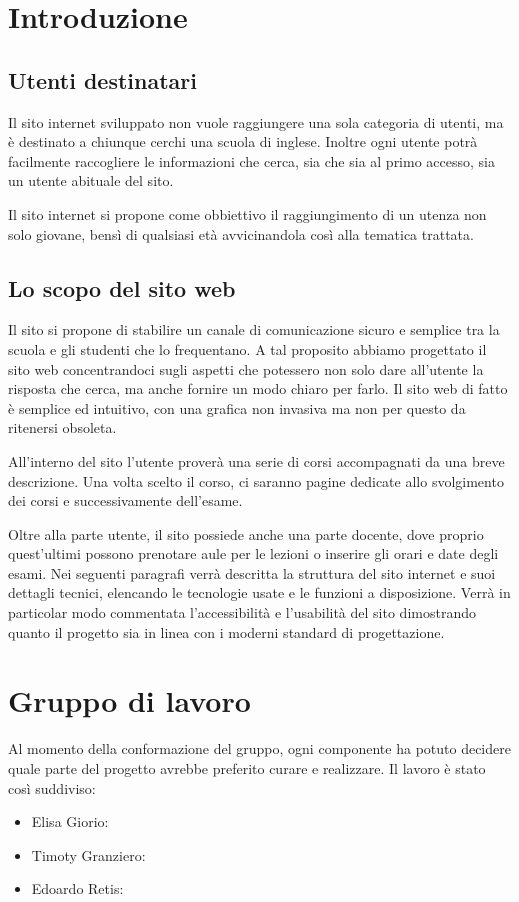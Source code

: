 \documentclass[12pt, a4paper]{article}
\begin{document}
\section{Introduzione}

\subsection{Utenti destinatari}
Il sito internet sviluppato non vuole raggiungere una sola categoria di utenti, ma è destinato a chiunque cerchi una scuola di inglese.  Inoltre ogni utente potrà facilmente raccogliere le informazioni che cerca, sia che sia al primo accesso, sia un utente abituale del sito.\par
Il sito internet si propone come obbiettivo il raggiungimento di un utenza non solo giovane, bensì di qualsiasi età avvicinandola così alla tematica trattata.

\subsection{Lo scopo del sito web}
Il sito si propone di stabilire un canale di comunicazione sicuro e semplice tra la scuola e gli studenti che lo frequentano. A tal proposito abbiamo progettato il sito web concentrandoci sugli aspetti che potessero non solo dare all’utente la risposta che cerca, ma anche fornire un modo chiaro per farlo. Il sito web di fatto è semplice ed intuitivo, con una grafica non invasiva ma non per questo da ritenersi obsoleta.\par
\smallskip
All’interno del sito l’utente proverà una serie di corsi accompagnati da una breve descrizione. Una volta scelto il corso, ci saranno pagine dedicate allo svolgimento dei corsi e successivamente dell’esame.\par
\smallskip
Oltre alla parte utente, il sito possiede anche una parte docente, dove proprio quest’ultimi possono prenotare aule per le lezioni o inserire gli orari e date degli esami.
Nei seguenti paragrafi verrà descritta la struttura del sito internet e suoi dettagli tecnici, elencando le tecnologie usate e le funzioni a disposizione. Verrà in particolar modo commentata l’accessibilità e l’usabilità del sito dimostrando quanto il progetto sia in linea con i moderni standard di progettazione.

\section{Gruppo di lavoro}
Al momento della conformazione del gruppo, ogni componente ha potuto decidere quale parte del progetto avrebbe preferito curare e realizzare. 
Il lavoro è stato così suddiviso:
\begin{itemize}
	\item Elisa Giorio:
	\item Timoty Granziero:
	\item Edoardo Retis:
\end{itemize}
\end{document}
